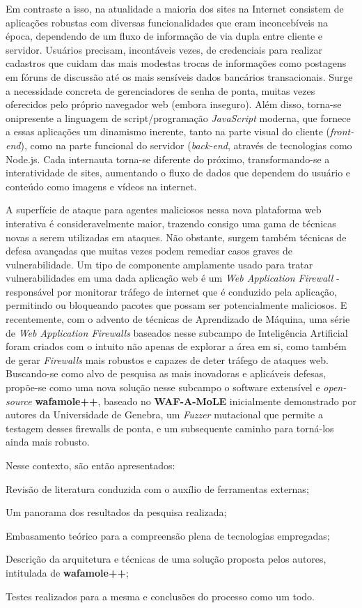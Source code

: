 Em contraste a isso, na atualidade a maioria dos sites na Internet consistem de aplicações robustas com diversas funcionalidades que eram inconcebíveis na época, dependendo de um fluxo de informação de via dupla entre cliente e servidor. Usuários precisam, incontáveis vezes, de credenciais para realizar cadastros que cuidam das mais modestas trocas de informações como postagens em fóruns de discussão até os mais sensíveis dados bancários transacionais. Surge a necessidade concreta de gerenciadores de senha de ponta, muitas vezes oferecidos pelo próprio navegador web (embora inseguro). Além disso, torna-se onipresente a linguagem de script/programação \textit{JavaScript} moderna, que fornece a essas aplicações um dinamismo inerente, tanto na parte visual do cliente (\textit{front-end}), como na parte funcional do servidor (\textit{back-end}, através de tecnologias como Node.js. Cada internauta torna-se diferente do próximo, transformando-se a interatividade de sites, aumentando o fluxo de dados que dependem do usuário e conteúdo como imagens e vídeos na internet.

A superfície de ataque para agentes maliciosos nessa nova plataforma web interativa é consideravelmente maior, trazendo consigo uma gama de técnicas novas a serem utilizadas em ataques. Não obstante, surgem também técnicas de defesa avançadas que muitas vezes podem remediar casos graves de vulnerabilidade. Um tipo de componente amplamente usado para tratar vulnerabilidades em uma dada aplicação web é um \textit{Web Application Firewall} - responsável por monitorar tráfego de internet que é conduzido pela aplicação, permitindo ou bloqueando pacotes que possam ser potencialmente maliciosos. E recentemente, com o advento de técnicas de Aprendizado de Máquina, uma série de \textit{Web Application Firewalls} baseados nesse subcampo de Inteligência Artificial foram criados com o intuito não apenas de explorar a área em si, como também de gerar \textit{Firewalls} mais robustos e capazes de deter tráfego de ataques web. Buscando-se como alvo de pesquisa as mais inovadoras e aplicáveis defesas, propõe-se como uma nova solução nesse subcampo o software extensível e \textit{open-source}  \textbf{wafamole++}, baseado no \textbf{WAF-A-MoLE} \cite{valenza_waf--mole_2020} inicialmente demonstrado por autores da Universidade de Genebra, um \textit{Fuzzer} mutacional que permite a testagem desses firewalls de ponta, e um subsequente caminho para torná-los ainda mais robusto.

Nesse contexto, são então apresentados: 
\begin{alineas}
\item Revisão de literatura conduzida com o auxílio de ferramentas externas;
\item Um panorama dos resultados da pesquisa realizada;
\item Embasamento teórico para a compreensão plena de tecnologias empregadas;
\item Descrição da arquitetura e técnicas de uma solução proposta pelos autores, intitulada de \textbf{wafamole++};
\item Testes realizados para a mesma e conclusões do processo como um todo.
\end{alineas}



